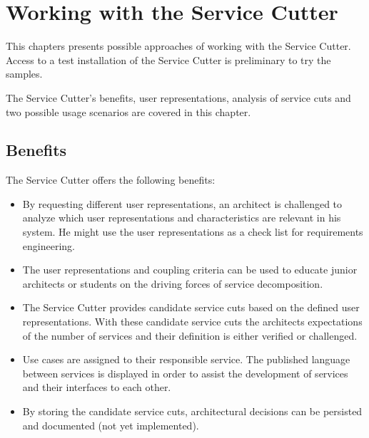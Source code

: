 \chapter{Working with the Service Cutter} 

This chapters presents possible approaches of working with the Service Cutter. Access to a test installation of the Service Cutter is preliminary to try the samples.

The Service Cutter's benefits, user representations, analysis of service cuts and two possible usage scenarios are covered in this chapter.

\section{Benefits}

The Service Cutter offers the following benefits:

\begin{itemize}
	\item By requesting different user representations, an architect is challenged to analyze which user representations and characteristics are relevant in his system. He might use the user representations as a check list for requirements engineering.
	\item The user representations and coupling criteria can be used to educate junior architects or students on the driving forces of service decomposition.
	\item The Service Cutter provides candidate service cuts based on the defined user representations. With these candidate service cuts the architects expectations of the number of services and their definition is either verified or challenged. 
	\item Use cases are assigned to their responsible service. The published language between services is displayed in order to assist the development of services and their interfaces to each other.
	\item By storing the candidate service cuts, architectural decisions can be persisted and documented (not yet implemented).
	
	
\end{itemize}






